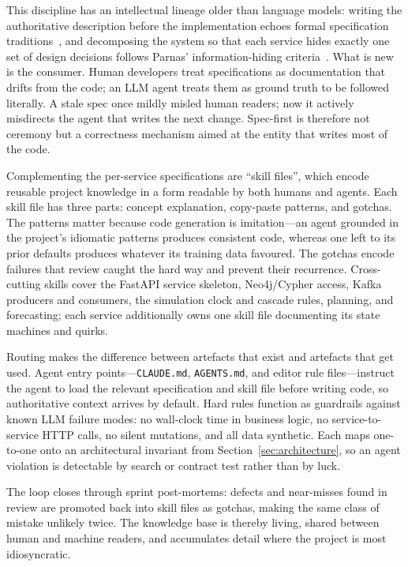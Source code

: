 \documentclass[runningheads]{llncs}
\begin{document}
This discipline has an intellectual lineage older than language models: writing the authoritative description before the implementation echoes formal specification traditions~\cite{lamport2002}, and decomposing the system so that each service hides exactly one set of design decisions follows Parnas' information-hiding criteria~\cite{parnas1972}. What is new is the consumer. Human developers treat specifications as documentation that drifts from the code; an LLM agent treats them as ground truth to be followed literally. A stale spec once mildly misled human readers; now it actively misdirects the agent that writes the next change. Spec-first is therefore not ceremony but a correctness mechanism aimed at the entity that writes most of the code.

Complementing the per-service specifications are ``skill files'', which encode reusable project knowledge in a form readable by both humans and agents. Each skill file has three parts: concept explanation, copy-paste patterns, and gotchas. The patterns matter because code generation is imitation---an agent grounded in the project's idiomatic patterns produces consistent code, whereas one left to its prior defaults produces whatever its training data favoured. The gotchas encode failures that review caught the hard way and prevent their recurrence. Cross-cutting skills cover the FastAPI service skeleton, Neo4j/Cypher access, Kafka producers and consumers, the simulation clock and cascade rules, planning, and forecasting; each service additionally owns one skill file documenting its state machines and quirks.

Routing makes the difference between artefacts that exist and artefacts that get used. Agent entry points---\texttt{CLAUDE.md}, \texttt{AGENTS.md}, and editor rule files---instruct the agent to load the relevant specification and skill file before writing code, so authoritative context arrives by default. Hard rules function as guardrails against known LLM failure modes: no wall-clock time in business logic, no service-to-service HTTP calls, no silent mutations, and all data synthetic. Each maps one-to-one onto an architectural invariant from Section~\ref{sec:architecture}, so an agent violation is detectable by search or contract test rather than by luck.

The loop closes through sprint post-mortems: defects and near-misses found in review are promoted back into skill files as gotchas, making the same class of mistake unlikely twice. The knowledge base is thereby living, shared between human and machine readers, and accumulates detail where the project is most idiosyncratic.
\end{document}
